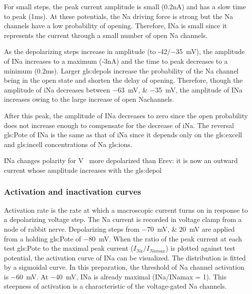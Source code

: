 \documentclass[../../Orator]{subfiles}
\begin{document}
For small steps, the peak current amplitude is small (0.2nA) and has a slow time to peak (1ms). At these potentials, the \gls{Na} driving force is strong but the \gls{Na} channels have a low probability of opening. Therefore, INa is small since it represents the current through a small number of open \gls{Na} channels. 

As the depolarizing steps increase in amplitude (to -42/\qty{-35}{\mV}), the amplitude of INa increases to a maximum (-3nA) and the time to peak decreases to a minimum (0.2ms). Larger \glspl{gls:depol} increase the probability of the \gls{Na} channel being in the open state and shorten the delay of opening. Therefore, though the amplitude of iNa decreases between \qtylist{-63;-35}{\mV}, the amplitude of INa increases owing to the large increase of open \gls{Na}channels. 

After this peak, the amplitude of INa decreases to zero since the open probability does not increase enough to compensate for the decrease of iNa. The reversal \gls{gls:Pote} of INa is the same as that of iNa since it depends only on the \gls{gls:excell} and \gls{gls:incell} concentrations of \gls{Na} \glspl{gls:ion}.

INa changes polarity for \unit{\V\membrane} more depolarized than Erev: it is now an outward current whose amplitude increases with the \gls{gls:depol} 

\subsubsection{Activation and inactivation curves }
Activation rate is the rate at which a macroscopic current turns on in response to a depolarizing voltage step. The \gls{Na} current is recorded in voltage clamp from a node of rabbit nerve. Depolarizing steps from \qtylist{-70;20}{\mV} are applied from a holding \gls{gls:Pote} of \qty{-80}{\mV}. When the ratio of the peak current at each test \gls{gls:Pote} to the maximal peak current (\(I_{Na}/I_{Namax}\)) is plotted against test potential, the activation curve of INa can be visualized. The distribution is fitted by a sigmoidal curve. In this preparation, the threshold of \gls{Na} channel activation is \qty{-60}{\mV}. At \qty{-40}{\mV}, INa is already maximal (INa/INamax = 1). This steepness of activation is a characteristic of the voltage-gated \gls{Na} channels. 
\end{document}
